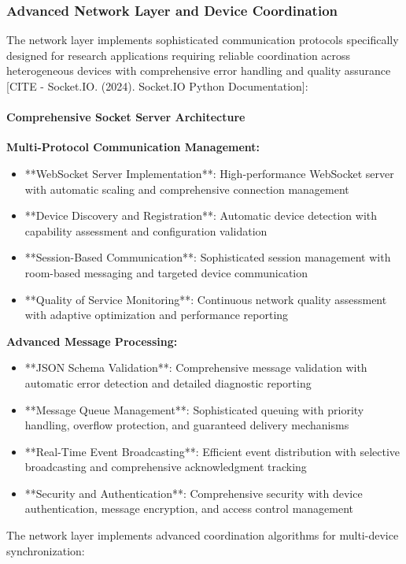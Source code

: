 \documentclass[11pt,a4paper]{report}
\begin{document}
\subsubsection{Advanced Network Layer and Device Coordination}

The network layer implements sophisticated communication protocols specifically designed for research applications
requiring reliable coordination across heterogeneous devices with comprehensive error handling and quality
assurance [CITE - Socket.IO. (2024). Socket.IO Python Documentation]:

\paragraph{Comprehensive Socket Server Architecture}

\textbf{Multi-Protocol Communication Management:}

\begin{itemize}
\item **WebSocket Server Implementation**: High-performance WebSocket server with automatic scaling and comprehensive
  connection management
\item **Device Discovery and Registration**: Automatic device detection with capability assessment and configuration
  validation
\item **Session-Based Communication**: Sophisticated session management with room-based messaging and targeted device
  communication
\item **Quality of Service Monitoring**: Continuous network quality assessment with adaptive optimization and performance
  reporting

\end{itemize}
\textbf{Advanced Message Processing:}

\begin{itemize}
\item **JSON Schema Validation**: Comprehensive message validation with automatic error detection and detailed diagnostic
  reporting
\item **Message Queue Management**: Sophisticated queuing with priority handling, overflow protection, and guaranteed
  delivery mechanisms
\item **Real-Time Event Broadcasting**: Efficient event distribution with selective broadcasting and comprehensive
  acknowledgment tracking
\item **Security and Authentication**: Comprehensive security with device authentication, message encryption, and access
  control management

\end{itemize}
The network layer implements advanced coordination algorithms for multi-device synchronization:
\end{document}
